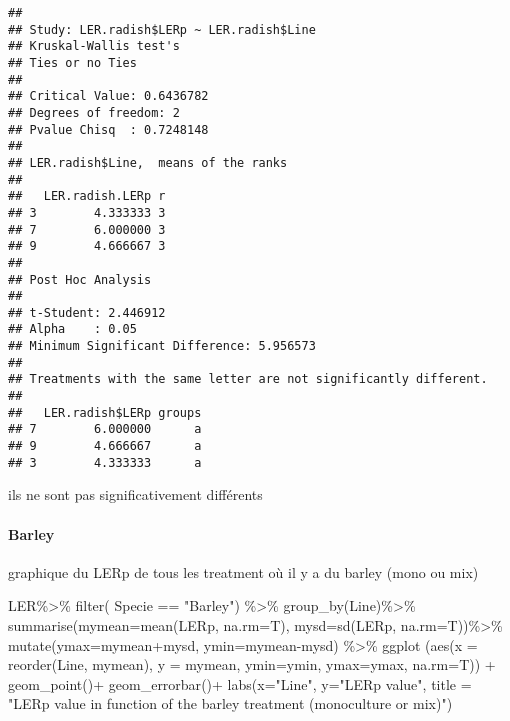 \documentclass[
]{article}
\newenvironment{Shaded}{\begin{snugshade}}{\end{snugshade}}
\newcommand{\AttributeTok}[1]{\textcolor[rgb]{0.77,0.63,0.00}{#1}}
\newcommand{\FunctionTok}[1]{\textcolor[rgb]{0.00,0.00,0.00}{#1}}
\newcommand{\NormalTok}[1]{#1}
\newcommand{\SpecialCharTok}[1]{\textcolor[rgb]{0.00,0.00,0.00}{#1}}
\newcommand{\StringTok}[1]{\textcolor[rgb]{0.31,0.60,0.02}{#1}}
\begin{document}
\begin{verbatim}
## 
## Study: LER.radish$LERp ~ LER.radish$Line
## Kruskal-Wallis test's
## Ties or no Ties
## 
## Critical Value: 0.6436782
## Degrees of freedom: 2
## Pvalue Chisq  : 0.7248148 
## 
## LER.radish$Line,  means of the ranks
## 
##   LER.radish.LERp r
## 3        4.333333 3
## 7        6.000000 3
## 9        4.666667 3
## 
## Post Hoc Analysis
## 
## t-Student: 2.446912
## Alpha    : 0.05
## Minimum Significant Difference: 5.956573 
## 
## Treatments with the same letter are not significantly different.
## 
##   LER.radish$LERp groups
## 7        6.000000      a
## 9        4.666667      a
## 3        4.333333      a
\end{verbatim}

ils ne sont pas significativement différents

\hypertarget{barley}{%
\paragraph{Barley}\label{barley}}

graphique du LERp de tous les treatment où il y a du barley (mono ou
mix)

\begin{Shaded}
\begin{Highlighting}[]
\NormalTok{LER}\SpecialCharTok{\%\textgreater{}\%}
  \FunctionTok{filter}\NormalTok{( Specie }\SpecialCharTok{==} \StringTok{"Barley"}\NormalTok{) }\SpecialCharTok{\%\textgreater{}\%}
  \FunctionTok{group\_by}\NormalTok{(Line)}\SpecialCharTok{\%\textgreater{}\%}
  \FunctionTok{summarise}\NormalTok{(}\AttributeTok{mymean=}\FunctionTok{mean}\NormalTok{(LERp, }\AttributeTok{na.rm=}\NormalTok{T),}
            \AttributeTok{mysd=}\FunctionTok{sd}\NormalTok{(LERp, }\AttributeTok{na.rm=}\NormalTok{T))}\SpecialCharTok{\%\textgreater{}\%}
  \FunctionTok{mutate}\NormalTok{(}\AttributeTok{ymax=}\NormalTok{mymean}\SpecialCharTok{+}\NormalTok{mysd, }\AttributeTok{ymin=}\NormalTok{mymean}\SpecialCharTok{{-}}\NormalTok{mysd) }\SpecialCharTok{\%\textgreater{}\%}
  \FunctionTok{ggplot}\NormalTok{ (}\FunctionTok{aes}\NormalTok{(}\AttributeTok{x =} \FunctionTok{reorder}\NormalTok{(Line, mymean), }\AttributeTok{y =}\NormalTok{ mymean,}
              \AttributeTok{ymin=}\NormalTok{ymin, }\AttributeTok{ymax=}\NormalTok{ymax, }\AttributeTok{na.rm=}\NormalTok{T)) }\SpecialCharTok{+} 
  \FunctionTok{geom\_point}\NormalTok{()}\SpecialCharTok{+}
  \FunctionTok{geom\_errorbar}\NormalTok{()}\SpecialCharTok{+}
  \FunctionTok{labs}\NormalTok{(}\AttributeTok{x=}\StringTok{"Line"}\NormalTok{, }\AttributeTok{y=}\StringTok{"LERp value"}\NormalTok{, }\AttributeTok{title =} \StringTok{"LERp value in function of the barley treatment (monoculture or mix)"}\NormalTok{)}
\end{Highlighting}
\end{Shaded}
\end{document}
